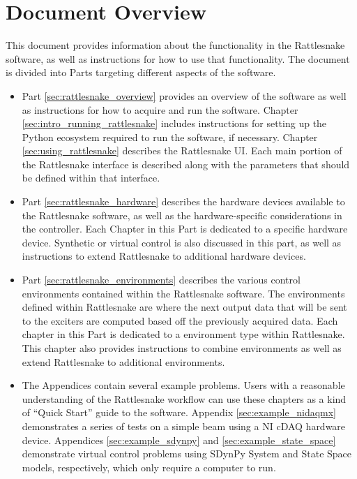 \documentclass[pdf,12pt,report]{SANDreport}
\begin{document}
    \section{Document Overview}\label{sec:intro_document_overview}
    This document provides information about the functionality in the Rattlesnake software, as well as instructions for how to use that functionality.  The document is divided into Parts targeting different aspects of the software.
    \begin{itemize}
        \item Part \ref{sec:rattlesnake_overview} provides an overview of the software as well as instructions for how to acquire and run the software.  Chapter \ref{sec:intro_running_rattlesnake} includes instructions for setting up the Python ecosystem required to run the software, if necessary.  Chapter \ref{sec:using_rattlesnake} describes the Rattlesnake \ac{UI}.  Each main portion of the Rattlesnake interface is described along with the parameters that should be defined within that interface.
        \item Part \ref{sec:rattlesnake_hardware} describes the hardware devices available to the Rattlesnake software, as well as the hardware-specific considerations in the controller.  Each Chapter in this Part is dedicated to a specific hardware device.  Synthetic or virtual control is also discussed in this part, as well as instructions to extend Rattlesnake to additional hardware devices.
        \item Part \ref{sec:rattlesnake_environments} describes the various control environments contained within the Rattlesnake software.  The environments defined within Rattlesnake are where the next output data that will be sent to the exciters are computed based off the previously acquired data.  Each chapter in this Part is dedicated to a environment type within Rattlesnake.  This chapter also provides instructions to combine environments as well as extend Rattlesnake to additional environments.
        \item The Appendices contain several example problems.  Users with a reasonable understanding of the Rattlesnake workflow can use these chapters as a kind of ``Quick Start'' guide to the software.  Appendix \ref{sec:example_nidaqmx} demonstrates a series of tests on a simple beam using a NI cDAQ hardware device.  Appendices \ref{sec:example_sdynpy} and \ref{sec:example_state_space} demonstrate virtual control problems using SDynPy System and State Space models, respectively, which only require a computer to run.
    \end{itemize}
    
\end{document}
